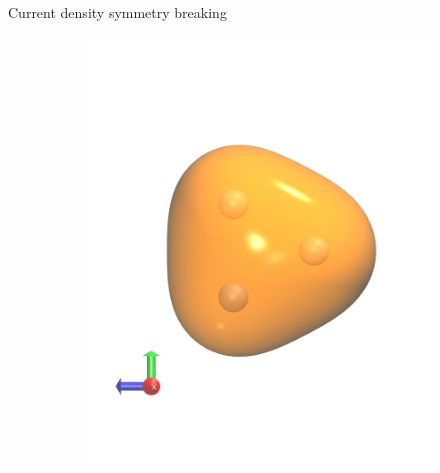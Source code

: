 \begin{frame}{Current density symmetry breaking}
\begin{itemize}
{\begin{itemize}
\begin{figure}
\begin{subfigure}{.40\textwidth}
              \includegraphics{./cursym/data/h3/b1_1200ppi.png}
            \end{subfigure}
          \end{figure}
        \end{itemize}
      }

    \end{itemize}
  \end{frame}


